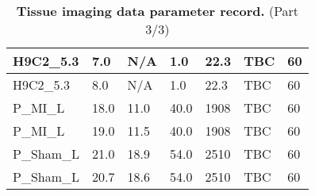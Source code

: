 \begin{table}[H]
\begin{tabular}{|>{\small}l||>{\tiny}l|>{\tiny}l|>{\tiny}l|>{\tiny}l|>{\tiny}l|>{\tiny}l|}
        H9C2\_5.3  & 7.0 & N/A & 1.0 & 22.3 & TBC & 60  \\ \hline
        H9C2\_5.3  & 8.0 & N/A & 1.0 & 22.3 & TBC & 60  \\ \hline
        P\_MI\_L  & 18.0 & 11.0 & 40.0 & 1908 & TBC & 60  \\ \hline
        P\_MI\_L  & 19.0 & 11.5 & 40.0 & 1908 & TBC & 60  \\ \hline
        P\_Sham\_L  & 21.0 & 18.9 & 54.0 & 2510 & TBC & 60  \\ \hline
        P\_Sham\_L & 20.7 & 18.6 & 54.0 & 2510 & TBC & 60  \\ \hline
       
    \end{tabular}
    \medskip
\caption{\textbf{Tissue imaging data parameter record.} (Part 3/3)}
\end{table}
